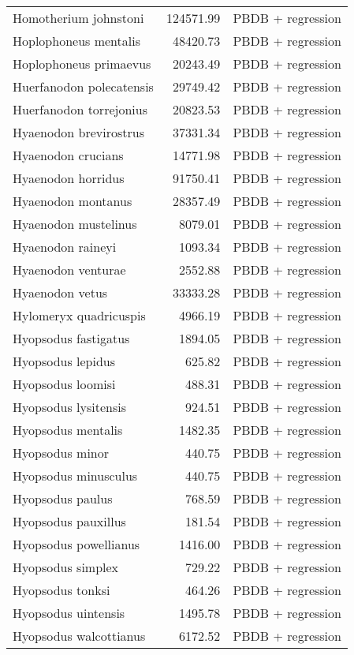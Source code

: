 \begin{table}[ht]
\begin{tabular}{lrl}
  Homotherium johnstoni & 124571.99 & PBDB + regression \\ 
  Hoplophoneus mentalis & 48420.73 & PBDB + regression \\ 
  Hoplophoneus primaevus & 20243.49 & PBDB + regression \\ 
  Huerfanodon polecatensis & 29749.42 & PBDB + regression \\ 
  Huerfanodon torrejonius & 20823.53 & PBDB + regression \\ 
  Hyaenodon brevirostrus & 37331.34 & PBDB + regression \\ 
  Hyaenodon crucians & 14771.98 & PBDB + regression \\ 
  Hyaenodon horridus & 91750.41 & PBDB + regression \\ 
  Hyaenodon montanus & 28357.49 & PBDB + regression \\ 
  Hyaenodon mustelinus & 8079.01 & PBDB + regression \\ 
  Hyaenodon raineyi & 1093.34 & PBDB + regression \\ 
  Hyaenodon venturae & 2552.88 & PBDB + regression \\ 
  Hyaenodon vetus & 33333.28 & PBDB + regression \\ 
  Hylomeryx quadricuspis & 4966.19 & PBDB + regression \\ 
  Hyopsodus fastigatus & 1894.05 & PBDB + regression \\ 
  Hyopsodus lepidus & 625.82 & PBDB + regression \\ 
  Hyopsodus loomisi & 488.31 & PBDB + regression \\ 
  Hyopsodus lysitensis & 924.51 & PBDB + regression \\ 
  Hyopsodus mentalis & 1482.35 & PBDB + regression \\ 
  Hyopsodus minor & 440.75 & PBDB + regression \\ 
  Hyopsodus minusculus & 440.75 & PBDB + regression \\ 
  Hyopsodus paulus & 768.59 & PBDB + regression \\ 
  Hyopsodus pauxillus & 181.54 & PBDB + regression \\ 
  Hyopsodus powellianus & 1416.00 & PBDB + regression \\ 
  Hyopsodus simplex & 729.22 & PBDB + regression \\ 
  Hyopsodus tonksi & 464.26 & PBDB + regression \\ 
  Hyopsodus uintensis & 1495.78 & PBDB + regression \\ 
  Hyopsodus walcottianus & 6172.52 & PBDB + regression \\ 

\end{tabular}
\end{table}

